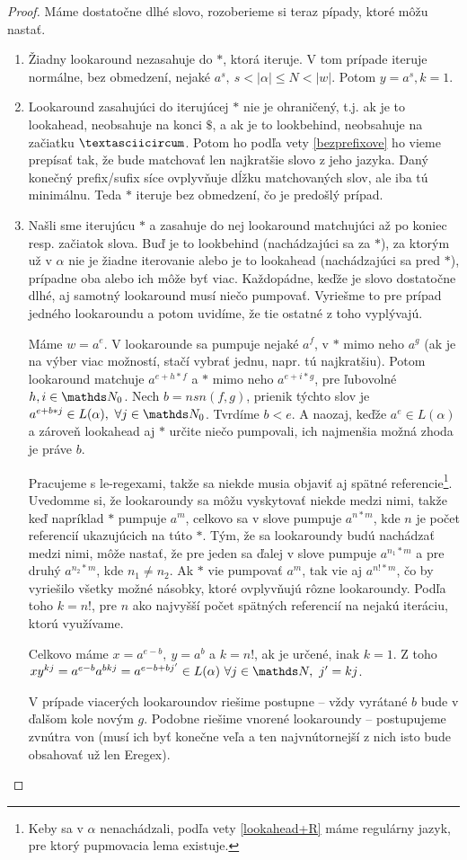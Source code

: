\begin{proof}
Máme dostatočne dlhé slovo, rozoberieme si teraz pípady, ktoré môžu nastať. 
\begin{enumerate}
\item Žiadny lookaround nezasahuje do $*$, ktorá iteruje. V tom prípade iteruje normálne, bez obmedzení, nejaké $a^s, ~ s<\vert \alpha \vert \leq N < \vert w \vert$. Potom $y=a^s, k=1$. 
\item Lookaround zasahujúci do iterujúcej $*$ nie je ohraničený, t.j. ak je to lookahead, neobsahuje na konci $\mathdollar$, a ak je to lookbehind, neobsahuje na začiatku $\textasciicircum$. Potom ho podľa vety \ref{bezprefixove} ho vieme prepísať tak, že bude matchovať len najkratšie slovo z jeho jazyka. Daný konečný prefix/sufix síce ovplyvňuje dĺžku matchovaných slov, ale iba tú minimálnu. Teda $*$ iteruje bez obmedzení, čo je predošlý prípad. 
\item Našli sme iterujúcu $*$ a zasahuje do nej lookaround matchujúci až po koniec resp. začiatok slova. Buď je to lookbehind (nachádzajúci sa za $*$), za ktorým už v $\alpha$ nie je žiadne iterovanie alebo je to lookahead (nachádzajúci sa pred $*$), prípadne oba alebo ich môže byť viac. Každopádne, keďže je slovo dostatočne dlhé, aj samotný lookaround musí niečo pumpovať. Vyriešme to pre prípad jedného lookaroundu a potom uvidíme, že tie ostatné z toho vyplývajú.

Máme $w=a^e$. V lookarounde sa pumpuje nejaké $a^f$, v $*$ mimo neho $a^g$ (ak je na výber viac možností, stačí vybrať jednu, napr. tú najkratšiu). Potom lookaround matchuje $a^{e+h*f}$ a $*$ mimo neho $a^{e+i*g}$, pre ľubovolné $h,i \in \N_0$. Nech $b = nsn(f,g)$, prienik týchto slov je $a^{e+b*j} \in L(\alpha), ~ \forall j \in \N_0$. Tvrdíme $b<e$. A naozaj, keďže $a^e \in L(\alpha)$ a zároveň lookahead aj $*$ určite niečo pumpovali, ich najmenšia možná zhoda je práve $b$.

Pracujeme s le-regexami, takže sa niekde musia objaviť aj spätné referencie\footnote{Keby sa v $\alpha$ nenachádzali, podľa vety \ref{lookahead+R} máme regulárny jazyk, pre ktorý pupmovacia lema existuje.}. Uvedomme si, že lookaroundy sa môžu vyskytovať niekde medzi nimi, takže keď napríklad $*$ pumpuje $a^m$, celkovo sa v slove pumpuje $a^{n*m}$, kde $n$ je počet referencií ukazujúcich na túto $*$. Tým, že sa lookaroundy budú nachádzať medzi nimi, môže nastať, že pre jeden sa ďalej v slove pumpuje $a^{n_1*m}$ a pre druhý $a^{n_2*m}$, kde $n_1 \neq n_2$. Ak $*$ vie pumpovať $a^m$, tak vie aj $a^{n!*m}$, čo by vyriešilo všetky možné násobky, ktoré ovplyvňujú rôzne lookaroundy. Podľa toho $k = n!$, pre $n$ ako najvyšší počet spätných referencií na nejakú iteráciu, ktorú využívame.

Celkovo máme $x=a^{e-b},~y=a^b$ a $k = n!$, ak je určené, inak $k=1$. Z toho $xy^{kj} = a^{e-b}a^{bkj} = a^{e-b+bj'} \in L(\alpha) ~ \forall j \in \N, ~ j' = kj$. 

V prípade viacerých lookaroundov riešime postupne -- vždy vyrátané $b$ bude v ďalšom kole novým $g$. Podobne riešime vnorené lookaroundy -- postupujeme zvnútra von (musí ich byť konečne veľa a ten najvnútornejší z nich isto bude obsahovať už len Eregex).
\end{enumerate}
\end{proof}

